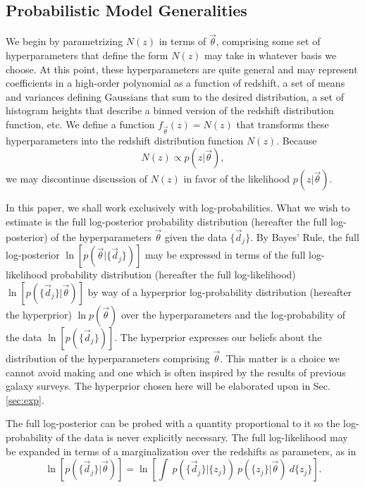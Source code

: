 \documentclass[preprint]{aastex}
\begin{document}
%
\subsection{Probabilistic Model Generalities}
\label{sec:prob}

We begin by parametrizing $N(z)$ in terms of $\vec{\theta}$, comprising some 
set of hyperparameters that define the form $N(z)$ may take in whatever basis 
we choose.  At this point, these hyperparameters are quite general and may 
represent coefficients in a high-order polynomial as a function of redshift, a 
set of means and variances defining Gaussians that sum to the desired 
distribution, a set of histogram heights that describe a binned version of the 
redshift distribution function, etc.  We define a function 
$f_{\vec{\theta}}(z)=N(z)$ that transforms these hyperparameters into the 
redshift distribution function $N(z)$.  Because 
\begin{equation}
\label{eq:definition}
N(z)\propto p(z|\vec{\theta}),
\end{equation}
we may discontinue discussion of $N(z)$ in favor of the likelihood 
$p(z|\vec{\theta})$.

In this paper, we shall work exclusively with log-probabilities.  What we wish 
to estimate is the full log-posterior probability distribution (hereafter the 
full log-posterior) of the hyperparameters $\vec{\theta}$ given the data 
$\{\vec{d}_{j}\}$.  By Bayes' Rule, the full log-posterior 
$\ln[p(\vec{\theta}|\{\vec{d}_{j}\})]$ may be expressed in terms of the full 
log-likelihood probability distribution (hereafter the full log-likelihood) 
$\ln[p(\{\vec{d}_{j}\}|\vec{\theta})]$ by way of a hyperprior log-probability 
distribution (hereafter the hyperprior) $\ln p(\vec{\theta})$ over the 
hyperparameters and the log-probability of the data $\ln[p(\{\vec{d}_{j}\})]$.  
The hyperprior expresses our beliefs about the distribution of the 
hyperparameters comprising $\vec{\theta}$.  This matter is a choice we cannot 
avoid making and one which is often inspired by the results of previous galaxy 
surveys.  The hyperprior chosen here will be elaborated upon in Sec. 
\ref{sec:exp}.

The full log-posterior can be probed with a quantity proportional to it so the 
log-probability of the data is never explicitly necessary.  The full 
log-likelihood may be expanded in terms of a marginalization over the redshifts 
as parameters, as in 
\begin{equation}
\label{eq:marginalize}
\ln[p(\{\vec{d}_{j}\}|\vec{\theta})] = \ln\left[\int\ 
p(\{\vec{d}_{j}\}|\{z_{j}\})\ p(\{z_{j}\}|\vec{\theta})\ d\{z_{j}\}\right].
\end{equation}
\end{document}
